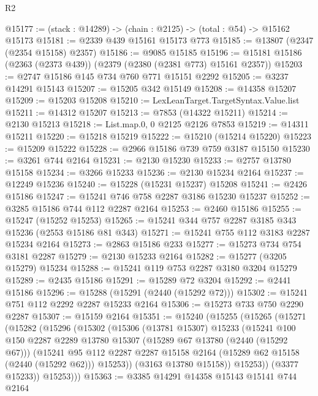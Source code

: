 \begin{lexlean}{R2}
\begin{coremodule}
@15177 := (stack : @14289) -> (chain : @2125) -> (total : @54) -> @15162 @15173
@15181 := @2339 @439 @15161 @15173 @773
@15185 := @13807 (@2347 (@2354 @15158) @2357)
@15186 := @9085 @15185
@15196 := @15181 @15186 (@2363 (@2373 @439)) (@2379 (@2380 (@2381 @773) @15161 @2357))
@15203 := @2747 @15186 @145 @734 @760 @771 @15151 @2292
@15205 := @3237 @14291 @15143
@15207 := @15205 @342 @15149
@15208 := @14358 @15207
@15209 := @15203 @15208
@15210 := LexLeanTarget.TargetSyntax.Value.list
@15211 := @14312 @15207
@15213 := @7853 (@14322 @15211)
@15214 := @2130 @15213
@15218 := List.map.{0, 0} @2125 @2126 @7853
@15219 := @14311 @15211
@15220 := @15218 @15219
@15222 := @15210 (@15214 @15220)
@15223 := @15209 @15222
@15228 := @2966 @15186 @739 @759 @3187 @15150
@15230 := @3261 @744 @2164
@15231 := @2130 @15230
@15233 := @2757 @13780 @15158
@15234 := @3266 @15233
@15236 := @2130 @15234 @2164
@15237 := @12249 @15236
@15240 := @15228 (@15231 @15237) @15208
@15241 := @2426 @15186
@15247 := @15241 @746 @758 @2287 @3186 @15230 @15237
@15252 := @3285 @15186 @744 @112 @2287 @2164
@15253 := @2460 @15186
@15255 := @15247 (@15252 @15253)
@15265 := @15241 @344 @757 @2287 @3185 @343 @15236 (@2553 @15186 @81 @343)
@15271 := @15241 @755 @112 @3183 @2287 @15234 @2164
@15273 := @2863 @15186 @233
@15277 := @15273 @734 @754 @3181 @2287
@15279 := @2130 @15233 @2164
@15282 := @15277 (@3205 @15279) @15234
@15288 := @15241 @119 @753 @2287 @3180 @3204 @15279
@15289 := @2435 @15186
@15291 := @15289 @72 @3204
@15292 := @2441 @15186
@15296 := @15288 (@15291 (@2440 (@15292 @72)))
@15302 := @15241 @751 @112 @2292 @2287 @15233 @2164
@15306 := @15273 @733 @750 @2290 @2287
@15307 := @15159 @2164
@15351 := @15240
    (@15255
      (@15265
        (@15271
          (@15282
            (@15296
              (@15302
                (@15306
                  (@13781 @15307)
                  @15233
                  (@15241
                    @100
                    @150
                    @2287
                    @2289
                    @13780
                    @15307
                    (@15289 @67 @13780 (@2440 (@15292 @67)))
                    (@15241
                      @95
                      @112
                      @2287
                      @2287
                      @15158
                      @2164
                      (@15289 @62 @15158 (@2440 (@15292 @62)))
                      @15253))
                  (@3163 @13780 @15158))
                @15253))
            (@3377 @15233))
          @15253)))
@15363 := @3385
    @14291
    @14358
    @15143
    @15141
    @744
    @2164

\end{coremodule}
\end{lexlean}
